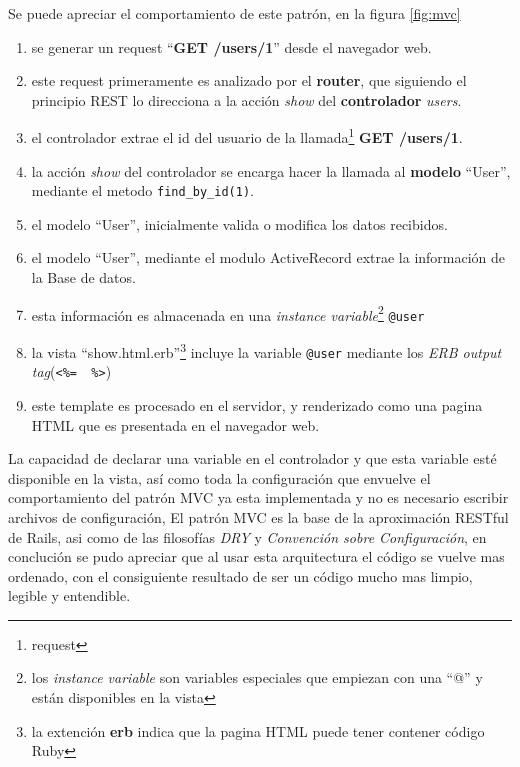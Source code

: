       Se puede apreciar el comportamiento de este patrón, en la figura \ref{fig:mvc}

      \begin{enumerate}
        \item se  generar un request ``\textbf{GET /users/1}'' desde el navegador web.
        \item este request primeramente es analizado por el \textbf{router}, que siguiendo el principio
        REST  lo direcciona a la acción \emph{show} del \textbf{controlador} \emph{users}.
        \item el controlador extrae el id del usuario de la llamada\footnote{ request} \textbf{GET /users/1}.
        \item la acción \emph{show} del controlador se encarga hacer la llamada al \textbf{modelo} ``User'',
        mediante el metodo \verb|find_by_id(1)|.
        \item el modelo ``User'', inicialmente valida o modifica los datos recibidos.
        \item el modelo ``User'', mediante el modulo ActiveRecord 
        extrae  la informaci\'on de la Base de datos.
        \item esta informaci\'on es almacenada en una
         \emph{instance variable}\footnote{los \emph{instance variable} son 
         variables especiales que empiezan con una ``@'' y están disponibles en la vista } \verb|@user|
        \item la vista ``show.html.erb''\footnote{ la extenci\'on \textbf{erb} 
        indica que la pagina HTML puede  tener contener código Ruby} incluye la variable \verb|@user| mediante los
        \emph{ERB output tag}(\verb|<%=  %>|)
        \item este template es procesado en el servidor, y renderizado como una 
        pagina HTML que es presentada en el navegador web.%
      \end{enumerate}



      La capacidad de declarar una variable en el controlador y 
      que esta variable esté disponible en la vista, así como toda 
      la configuración que envuelve el comportamiento del patrón MVC 
      ya esta implementada y no es necesario escribir archivos de configuración, 
      El patr\'on MVC es la base de la aproximaci\'on RESTful de Rails, asi como  de las filosofías 
      \emph{DRY} y \emph{Convenci\'on sobre Configuraci\'on}, 
           en concluci\'on se pudo apreciar que       al usar esta arquitectura el código 
      se vuelve mas  ordenado, con el consiguiente resultado de ser un código 
      mucho mas limpio, legible y entendible. \\ %


